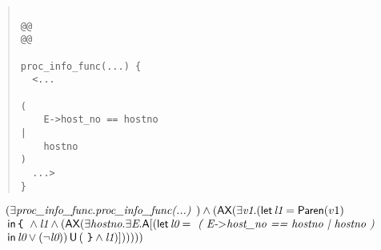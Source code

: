 \documentclass{article}
\newcommand{\U}{\,\mbox{\sf{U}}\,}
\newcommand{\A}{\mbox{\sf{A}}}
\newcommand{\AX}{\mbox{\sf{AX}}}
\newcommand{\mita}[1]{\mbox{\it{{#1}}}}
\newcommand{\msf}[1]{\mbox{\sf{{#1}}}}
\newcommand{\mth}[1]{\({#1}\)}
\newcommand{\ttlb}{\mbox{\tt \char'173}}
\newcommand{\ttrb}{\mbox{\tt \char'175}}
\begin{document}
\begin{quote}\begin{verbatim}

@@
@@

proc_info_func(...) {
  <...
    
(
    E->host_no == hostno
|
    hostno
)
  ...>
}
\end{verbatim}\end{quote}

\[\begin{array}{l}
(\exists \mita{proc\_info\_func} . \mita{proc\_info\_func(...) }) \wedge (\AX(\exists \mita{v1} . (\mita{\sf{let}} \, \mita{l1} = \msf{Paren}(v1)\\\mbox{} \, \mita{\sf{in}} \, \mita{{\ttlb}
  } \wedge \mita{l1} \wedge (\AX(\exists \mita{hostno} . \exists \mita{E} . \A[(\mita{\sf{let}} \, \mita{l0} = \mita{
(
E-\mth{>}host\_no == hostno
|
hostno
)}\\\mbox{} \, \mita{\sf{in}} \, \mita{l0} \vee (\neg \mita{l0})
) \U (\mita{
{\ttrb}} \wedge \mita{l1})]
))
)))
\end{array}\]
\end{document}
